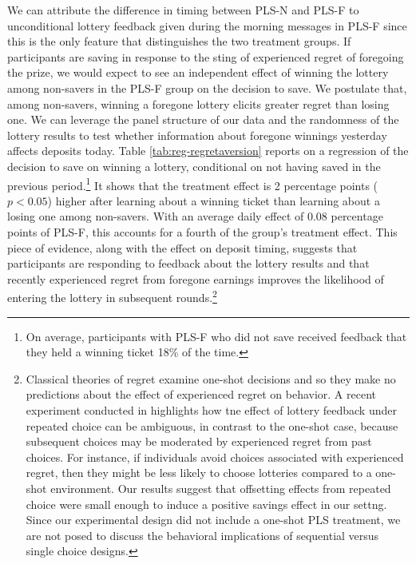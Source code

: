 \documentclass[11pt]{article}
\begin{document}
		We can attribute the difference in timing between PLS-N and PLS-F to unconditional lottery feedback given during the morning messages in PLS-F since this is the only feature that distinguishes the two treatment groups. If participants are saving in response to the sting of experienced regret of foregoing the prize, we would expect to see an independent effect of winning the lottery among non-savers in the PLS-F group on the decision to save. We postulate that, among non-savers, winning a foregone lottery elicits greater regret than losing one. We can leverage the panel structure of our data and the randomness of the lottery results to test whether information about foregone winnings yesterday affects deposits today. Table \ref{tab:reg-regretaversion} reports on a regression of the decision to save on winning a lottery, conditional on not having saved in the previous period.\footnote{On average, participants with PLS-F who did not save received feedback that they held a winning ticket 18\% of the time.} It shows that the treatment effect is 2 percentage points ($p<0.05$) higher after learning about a winning ticket than learning about a losing one among non-savers. With an average daily effect of 0.08 percentage points of PLS-F, this accounts for a fourth of the group's treatment effect. This piece of evidence, along with the effect on deposit timing, suggests that participants are responding to feedback about the lottery results and that recently experienced regret from foregone earnings improves the likelihood of entering the lottery in subsequent rounds.\footnote{Classical theories of regret examine one-shot decisions and so they make no predictions about the effect of experienced regret on behavior. A recent experiment conducted in \textcite{imas_regret_2016} highlights how tne effect of lottery feedback under repeated choice can be ambiguous, in contrast to the one-shot case, because subsequent choices may be moderated by experienced regret from past choices. For instance, if individuals avoid choices associated with experienced regret, then they might be less likely to choose lotteries compared to a one-shot environment. Our results suggest that offsetting effects from repeated choice were small enough to induce a positive savings effect in our settng. Since our experimental design did not include a one-shot PLS treatment, we are not posed to discuss the behavioral implications of sequential versus single choice designs.}

		
\end{document}
